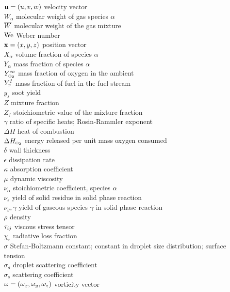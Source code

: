 \documentclass[11pt]{book}
\begin{document}
\begin{tabbing}
${\bf u}=(u,v,w)$             \> velocity vector  \\
$W_\alpha$                \> molecular weight of gas species $\alpha$ \\
$\overline{W}$                     \> molecular weight of the gas mixture \\
$\hbox{We}$                     \> Weber number \\
${\bf x}=(x,y,z)$             \> position vector  \\
$X_\alpha$                \> volume fraction of species $\alpha$   \\
$Y_\alpha$                \> mass fraction of species $\alpha$   \\
$Y_{\tiny \hbox{O}_2}^\infty$          \> mass fraction of oxygen in the ambient   \\
$Y_{\tiny \hbox{F}}^I$                  \> mass fraction of fuel in the fuel stream   \\
$y_s$                     \> soot yield \\
$Z$                       \> mixture fraction   \\
$Z_f$                     \> stoichiometric value of the mixture fraction   \\
$\gamma$                  \> ratio of specific heats; Rosin-Rammler exponent \\
$\Delta H$                \> heat of combustion \\
$\Delta H_{\tiny \hbox{O}_2}$          \> energy released per unit mass oxygen consumed \\
$\delta$                  \> wall thickness \\
$\epsilon$                \> dissipation rate \\
$\kappa$                  \> absorption coefficient \\
$\mu$                     \> dynamic viscosity \\
$\nu_\alpha$              \> stoichiometric coefficient, species $\alpha$ \\
$\nu_s$           \> yield of solid residue in solid phase reaction \\
$\nu_g,\gamma$    \> yield of gaseous species $\gamma$ in solid phase reaction \\
$\rho$                    \> density \\
${\bf \tau}_{ij}$              \> viscous stress tensor \\
$\chi_r$                  \> radiative loss fraction \\
$\sigma$                  \> Stefan-Boltzmann constant; constant in droplet size distribution; surface tension \\
$\sigma_d$                \> droplet scattering coefficient \\
$\sigma_s$                \> scattering coefficient \\
${\bf \omega}=(\omega_x,\omega_y,\omega_z)$    \> vorticity vector \\
\end{tabbing}
\end{document}
